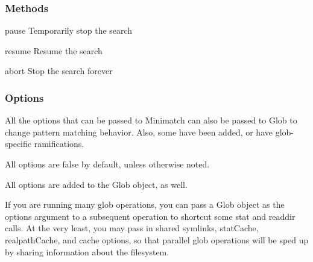 \subsubsection*{Methods}


\begin{DoxyItemize}
\item {\ttfamily pause} Temporarily stop the search
\item {\ttfamily resume} Resume the search
\item {\ttfamily abort} Stop the search forever
\end{DoxyItemize}

\subsubsection*{Options}

All the options that can be passed to Minimatch can also be passed to Glob to change pattern matching behavior. Also, some have been added, or have glob-\/specific ramifications.

All options are false by default, unless otherwise noted.

All options are added to the Glob object, as well.

If you are running many {\ttfamily glob} operations, you can pass a Glob object as the {\ttfamily options} argument to a subsequent operation to shortcut some {\ttfamily stat} and {\ttfamily readdir} calls. At the very least, you may pass in shared {\ttfamily symlinks}, {\ttfamily stat\+Cache}, {\ttfamily realpath\+Cache}, and {\ttfamily cache} options, so that parallel glob operations will be sped up by sharing information about the filesystem.


